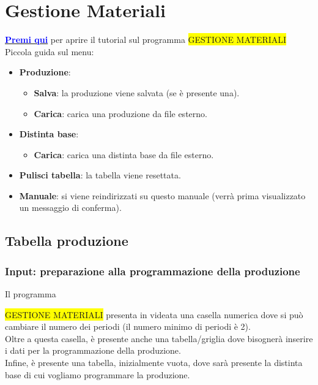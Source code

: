 \documentclass[12pt,twoside]{report}
\newcommand{\coloredbold}[2]{\textcolor{#1}{\textbf{#2}}}
\begin{document}
\chapter{Gestione Materiali}

\href{https://drive.google.com/open?id=12bM426mDh8YzTNTUMrs-MXbnYQTqyRln}{\coloredbold{blue}{Premi qui}} per aprire il tutorial sul programma \colorbox{yellow}{GESTIONE MATERIALI}\\

Piccola guida sul menu:
\begin{itemize}

	\item \textbf{Produzione}:
	
	\begin{itemize}
		\item \textbf{Salva}: la produzione viene salvata (se è presente una).
		\item \textbf{Carica}: carica una produzione da file esterno.
	\end{itemize}

	\item \textbf{Distinta base}:
	
	\begin{itemize}
		\item \textbf{Carica}: carica una distinta base da file esterno.
	\end{itemize}

	\item \textbf{Pulisci tabella}: la tabella viene resettata.
	\item \textbf{Manuale}: si viene reindirizzati su questo manuale (verrà prima visualizzato un messaggio di conferma).

\end{itemize}


\section{Tabella produzione}

\subsection{Input: preparazione alla programmazione della produzione}

\hypertarget{inputProduzione}{Il programma} \colorbox{yellow}{GESTIONE MATERIALI} presenta in videata una casella numerica dove si può cambiare il numero dei periodi (il numero minimo di periodi è 2).\\
Oltre a questa casella, è presente anche una tabella/griglia dove bisognerà inserire i dati per la programmazione della produzione.\\
Infine, è presente una tabella, inizialmente vuota, dove sarà presente la distinta base di cui vogliamo programmare la produzione.\\
\end{document}
